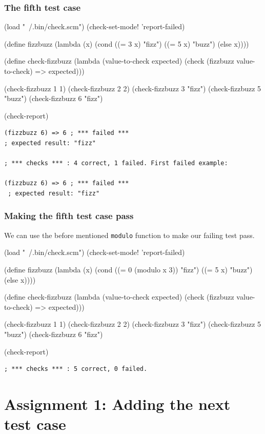\documentclass[12pt,a4paper,english,twoside]{article}
\begin{document}
\subsubsection{The fifth test case}
\begin{schemecode}
(load "~/.bin/check.scm")
(check-set-mode! 'report-failed)

(define fizzbuzz 
  (lambda (x) 
    (cond ((= 3 x) "fizz")
          ((= 5 x) "buzz")
          (else x))))

(define check-fizzbuzz 
  (lambda (value-to-check expected)
    (check (fizzbuzz value-to-check) => expected)))

(check-fizzbuzz 1 1)
(check-fizzbuzz 2 2)
(check-fizzbuzz 3 "fizz")
(check-fizzbuzz 5 "buzz")
(check-fizzbuzz 6 "fizz")

(check-report)
\end{schemecode}
\begin{lstlisting}
(fizzbuzz 6) => 6 ; *** failed ***
; expected result: "fizz"

; *** checks *** : 4 correct, 1 failed. First failed example:

(fizzbuzz 6) => 6 ; *** failed ***
 ; expected result: "fizz"
\end{lstlisting}
\subsubsection{Making the fifth test case pass}
We can use the before mentioned \texttt{modulo} function to make our failing 
test pass.
\begin{schemecode}
(load "~/.bin/check.scm")
(check-set-mode! 'report-failed)

(define fizzbuzz 
  (lambda (x) 
    (cond ((= 0 (modulo x 3)) "fizz")
          ((= 5 x) "buzz")
          (else x))))

(define check-fizzbuzz 
  (lambda (value-to-check expected)
    (check (fizzbuzz value-to-check) => expected)))

(check-fizzbuzz 1 1)
(check-fizzbuzz 2 2)
(check-fizzbuzz 3 "fizz")
(check-fizzbuzz 5 "buzz")
(check-fizzbuzz 6 "fizz")

(check-report)
\end{schemecode}
\begin{lstlisting}
; *** checks *** : 5 correct, 0 failed.
\end{lstlisting}
\section{Assignment 1: Adding the next test case}
\end{document}
